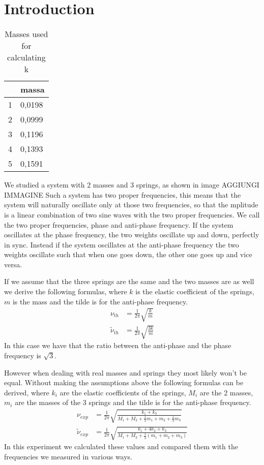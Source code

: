 \documentclass{article}
\begin{document}
\section{Introduction} \label{sec:intro}
\begin{wraptable}{r}{4cm}
    \centering
    \begin{tabular}{|l|l|}
    \hline
         & massa \\ \hline
        1 & 0,0198 \\ \hline
        2 & 0,0999 \\ \hline
        3 & 0,1196 \\ \hline
        4 & 0,1393 \\ \hline
        5 & 0,1591 \\ \hline
    \end{tabular}
    \caption{Masses used for calculating k}
    \label{tab:regm}
\end{wraptable}
We studied a system with 2 masses and 3 springs, as shown in image AGGIUNGI IMMAGINE
Such a system has two proper frequencies, this means that the system will naturally oscillate only at those two frequencies, so that the mplitude is a linear combination of two sine waves with the two proper frequencies. 
We call the two proper frequencies, phase and anti-phase frequency. If the system oscillates at the phase frequency, the two weights oscillate up and down, perfectly in sync. Instead if the system oscillates at the anti-phase frequency the two weights oscillate such that when one goes down, the other one goes up and vice versa. 

If we assume that the three springs are the same and the two masses are as well 
we derive the following formulas, where $k$ is the elastic coefficient of the springs, $m$ is the mass and the tilde is for the anti-phase frequency.
\begin{align}
    \nu_{th} &= \frac{1}{2\pi}   \sqrt{\frac{ k}{m}}
        \label{eq:nuth} \\
    \tilde \nu_{th} &= \frac{1}{2\pi}   \sqrt{\frac{3k}{m}}
        \label{eq:antinuth}
\end{align}
In this case we have that the ratio between the anti-phase and the phase frequency is $\sqrt 3$.

However when dealing with real masses and springs they most 
likely won't be equal. Without making the assumptions above 
the following formulas can be derived, where $k_i$ are the elastic coefficients of the springs, $M_i$ are the 2 masses, $m_i$ are the masses of the 3 springs and the tilde is for the anti-phase frequency.
\begin{align}
           \nu_{exp} &= \frac{1}{2\pi}   \sqrt{\frac{k_1+k_3}
           {M_1 + M_2 + \frac{1}{3} m_1 + m_2 + \frac{1}{3}m_3 }} 
           \label{eq:nuexp}  \\
    \tilde \nu_{exp} &= \frac{1}{2\pi}   \sqrt{\frac{k_1 +4k_2 +k_3}
           {M_1 + M_2 + \frac{1}{3} (m_1 + m_2 + m_3) }} 
           \label{eq:antinuexp} 
\end{align}
In this experiment we calculated these values and compared them with the frequencies we measured in various ways. 
\end{document}
